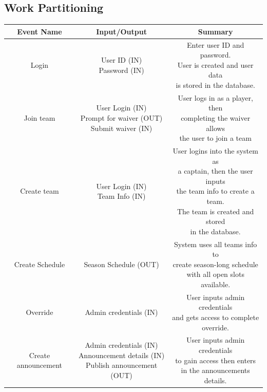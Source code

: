 \documentclass[12pt, titlepage]{article}
\begin{document}
\subsection{Work Partitioning}
\begin{center}
    \begin{tabular}{ |c|c|c| }
        \hline
        \textbf{Event Name}  & \textbf{Input/Output} & \textbf{Summary} \\
        \hline
        Login & \makecell{User ID (IN) \\ Password (IN)}
		& \makecell{Enter user ID and password.
		\\User is created and user data
		\\is stored in the database.} \\
        \hline
		Join team & \makecell{User Login (IN) \\ Prompt for waiver (OUT) \\ Submit waiver (IN)}
		& \makecell{User logs in as a player, then
		\\completing the waiver allows
		\\the user to join a team} \\
		\hline
        Create team & \makecell{User Login (IN) \\ Team Info (IN)}
		& \makecell{User logins into the system as
		\\a captain, then the user inputs
		\\the team info to create a team.
		\\The team is created and stored
		\\in the database.} \\
		\hline
        Create Schedule & Season Schedule (OUT)
		& \makecell{System uses all teams info to
		\\create season-long schedule
		\\with all open slots available.} \\
		\hline
        Override & Admin credentials (IN)
		& \makecell{User inputs admin credentials
		\\and gets access to complete
		\\override.} \\
		\hline
        Create announcement & \makecell{Admin credentials (IN)
		\\Announcement details (IN) \\Publish announcement (OUT)}
		& \makecell{User inputs admin credentials
		\\to gain access then enters
		\\in the announcements details.
}
\end{tabular}
\end{center}
\end{document}
